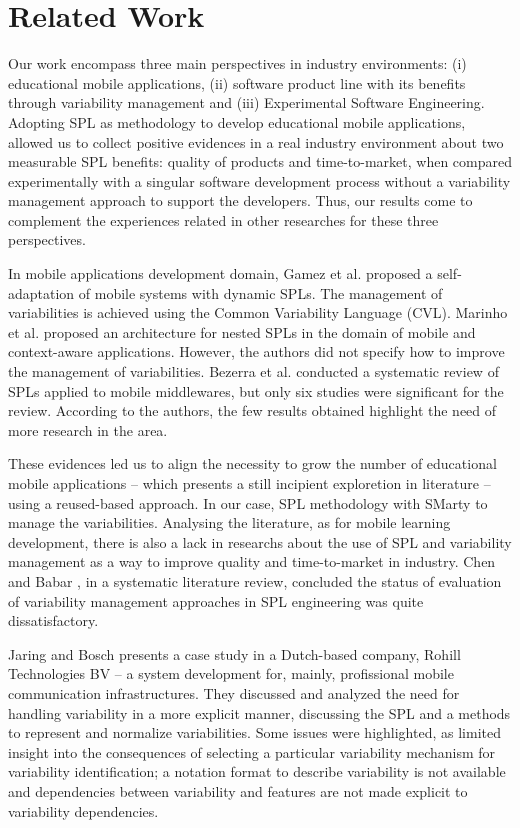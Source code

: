\section{Related Work} \label{section6}

Our work encompass three main perspectives in industry environments: (i) educational mobile applications,  (ii) software product line with its benefits through variability management and (iii) Experimental Software Engineering. Adopting SPL as methodology to develop educational mobile applications, allowed us to collect positive evidences in a real industry environment about two measurable SPL benefits: quality of products and time-to-market, when compared experimentally with a singular software development process without a variability management approach to support the developers. Thus, our results come to complement the experiences related in other researches for these three perspectives.

In mobile applications development domain, Gamez et al. \cite{gamez14} proposed a self-adaptation of mobile systems with dynamic SPLs. The management of variabilities is achieved using the Common Variability Language (CVL). Marinho et al. \cite{marinho10} proposed an architecture for nested SPLs in the domain of mobile and context-aware applications. However, the authors did not specify how to improve the management of variabilities. Bezerra et al. \cite{bezerra09} conducted a systematic review of SPLs applied to mobile middlewares, but only six studies were significant for the review. According to the authors, the few results obtained highlight the need of more research in the area. 

These evidences led us to align the necessity to grow the number of educational mobile applications -- which presents a still incipient exploretion in literature -- using a reused-based approach. In our case, SPL methodology with SMarty to manage the variabilities. Analysing the literature, as for mobile learning development, there is also a lack in researchs about the use of SPL and variability management as a way to improve quality and time-to-market in industry. Chen and Babar \cite{chen11}, in a systematic literature review, concluded the status of evaluation of variability management approaches in SPL engineering was quite dissatisfactory. 

Jaring and Bosch \cite{jaring02} presents a case study in a Dutch-based company, Rohill Technologies BV -- a system development for, mainly, profissional mobile communication infrastructures. They discussed and analyzed the need for handling variability in a more explicit manner, discussing the SPL and a methods to represent and normalize variabilities. Some issues were highlighted, as limited insight into the consequences of selecting a particular variability mechanism for variability identification; a notation format to describe variability is not available and dependencies between variability and features are not made explicit to variability dependencies.


